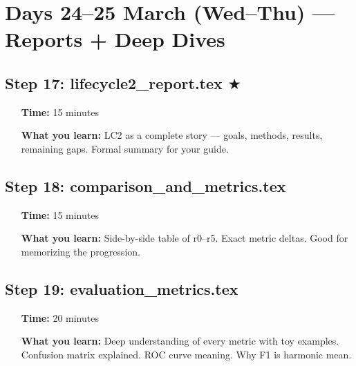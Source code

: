 \documentclass[12pt,a4paper]{article}
\begin{document}
\section{Days 24--25 March (Wed--Thu) --- Reports + Deep Dives}

\begin{center}
\end{center}

\subsection*{Step 17: lifecycle2\_report.tex $\bigstar$}
\begin{itemize}[leftmargin=1.5cm]
    \item[\textbf{Time:}] 15 minutes
    \item[\textbf{What you learn:}] LC2 as a complete story --- goals, methods, results, remaining gaps. Formal summary for your guide.
\end{itemize}

\subsection*{Step 18: comparison\_and\_metrics.tex}
\begin{itemize}[leftmargin=1.5cm]
    \item[\textbf{Time:}] 15 minutes
    \item[\textbf{What you learn:}] Side-by-side table of r0--r5. Exact metric deltas. Good for memorizing the progression.
\end{itemize}

\subsection*{Step 19: evaluation\_metrics.tex}
\begin{itemize}[leftmargin=1.5cm]
    \item[\textbf{Time:}] 20 minutes
    \item[\textbf{What you learn:}] Deep understanding of every metric with toy examples. Confusion matrix explained. ROC curve meaning. Why F1 is harmonic mean.
\end{itemize}
\end{document}
